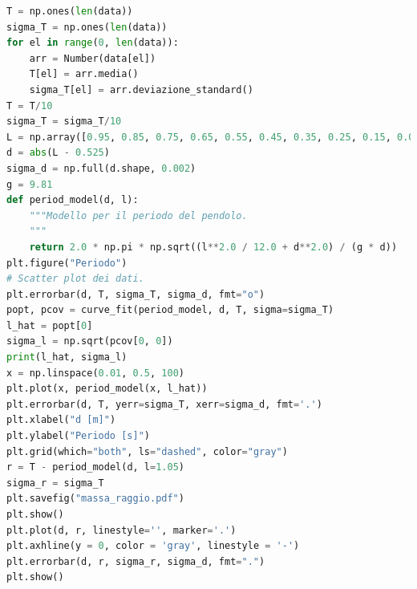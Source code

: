 \documentclass{article}
\begin{document}
\begin{minipage}{0.5\textwidth}
	\begin{lstlisting}[language=Python, firstnumber=24]
T = np.ones(len(data))
sigma_T = np.ones(len(data))
for el in range(0, len(data)):
    arr = Number(data[el])
    T[el] = arr.media()
    sigma_T[el] = arr.deviazione_standard()
T = T/10
sigma_T = sigma_T/10
L = np.array([0.95, 0.85, 0.75, 0.65, 0.55, 0.45, 0.35, 0.25, 0.15, 0.05])
d = abs(L - 0.525)
sigma_d = np.full(d.shape, 0.002) 
g = 9.81 
def period_model(d, l): 
    """Modello per il periodo del pendolo. 
    """ 
    return 2.0 * np.pi * np.sqrt((l**2.0 / 12.0 + d**2.0) / (g * d)) 
plt.figure("Periodo")
# Scatter plot dei dati. 
plt.errorbar(d, T, sigma_T, sigma_d, fmt="o")  
popt, pcov = curve_fit(period_model, d, T, sigma=sigma_T) 
l_hat = popt[0] 
sigma_l = np.sqrt(pcov[0, 0]) 
print(l_hat, sigma_l) 
x = np.linspace(0.01, 0.5, 100) 
plt.plot(x, period_model(x, l_hat))
plt.errorbar(d, T, yerr=sigma_T, xerr=sigma_d, fmt='.') 
plt.xlabel("d [m]") 
plt.ylabel("Periodo [s]")
plt.grid(which="both", ls="dashed", color="gray")
r = T - period_model(d, l=1.05)
sigma_r = sigma_T
plt.savefig("massa_raggio.pdf") 
plt.show()
plt.plot(d, r, linestyle='', marker='.')
plt.axhline(y = 0, color = 'gray', linestyle = '-') 
plt.errorbar(d, r, sigma_r, sigma_d, fmt=".")
plt.show()
	\end{lstlisting}
\end{minipage}
\newpage
\end{document}
